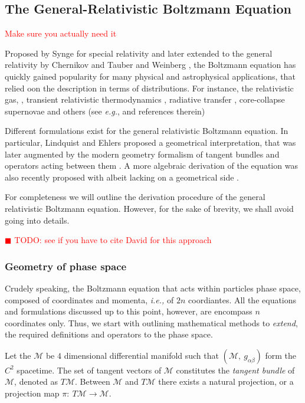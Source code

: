 \documentclass[11pt,a4paper,headinclude=true,DIV=14,BCOR=8mm,chapterprefix,listof=totoc,twoside,openright,abstracton]{scrbook}
\newcommand{\todo}[1]{\textcolor{red}{$\blacksquare$ TODO: #1}}
\newcommand{\red}[1]{\textcolor{red}{#1}}
\begin{document}

\subsection{The General-Relativistic Boltzmann Equation}
\red{Make sure you actually need it}

Proposed by Synge \cite{Synge:1957} for special relativity and later extended to the general relativity by Chernikov \cite{Chernikov:1962} and Tauber and Weinberg \cite{Tauber:1961}, the Boltzmann equation has quickly gained popularity for many physical and astrophysical applications, that relied oon the description in terms of distributions. For instance, the relativistic gas, \cite{Israel:1963}, transient relativistic thermodynamics \cite{Israel:1979wp}, radiative transfer \cite{Lindquist:1966}, core-collapse supernovae \cite{Bruenn:1985} and others (see \textit{e.g.}, \cite{Cercignani:2002} and references therein)

Different formulations exist for the general relativistic Boltzmann equation. In particular, Lindquist \cite{Lindquist:1966} and Ehlers \cite{Ehlers:1971} proposed a geometrical interpretation, that was later augmented by the modern geometry formalism of tangent bundles and operators acting between them \cite{Sasaki:1958,Sasaki:1962}. A more algebraic derivation of the equation was also recently proposed with albeit lacking on a geometrical side \cite{Debbasch:2009a,Debbasch:2009b}. 

For completeness we will outline the derivation procedure of the general relativistic Boltzmann equation. However, for the sake of brevity, we shall avoid going into details.

\todo{see if you have to cite David for this approach}


\subsubsection{Geometry of phase space}

Crudely speaking, the Boltzmann equation that acts within particles phase space, composed of coordinates and momenta, \textit{i.e.,} of $2n$ coordiantes. All the equations and formulations discussed up to this point, however, are encompass $n$ coordinates only. Thus, we start with outlining mathematical methods to \textit{extend}, the required definitions and operators to the phase space.

Let the $\mathcal{M}$ be $4$ dimensional differential manifold such that $(\mathcal{M},\: g_{\alpha\beta})$ form the $C^2$ spacetime. The set of tangent vectors of $\mathcal{M}$ constitutes the \textit{tangent bundle} of $\mathcal{M}$, denoted as $T\mathcal{M}$. Between $\mathcal{M}$ and $T\mathcal{M}$ there exists a natural projection, or a projection map $\pi:\: T\mathcal{M}\rightarrow\mathcal{M}$. 
\end{document}
